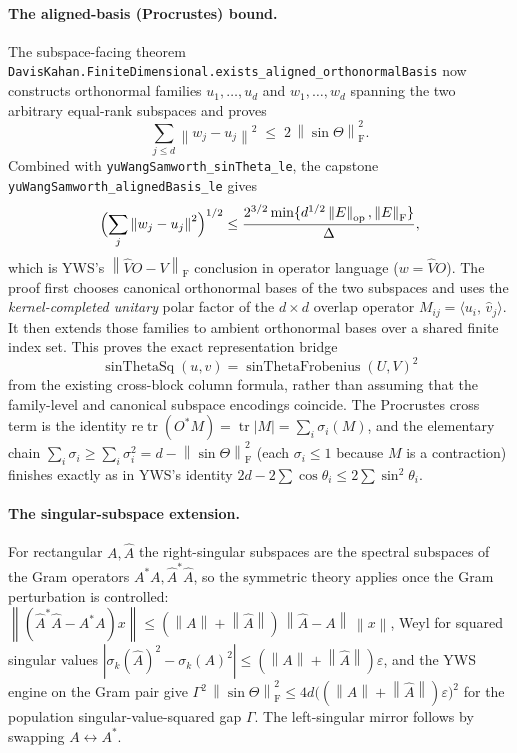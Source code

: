 \documentclass[11pt]{article}
\newcommand{\norm}[1]{\left\lVert #1\right\rVert}
\newcommand{\eps}{\varepsilon}
\newcommand{\F}{\mathrm{F}}
\newcommand{\op}{\mathrm{op}}
\newcommand{\inner}[2]{\langle #1,\,#2\rangle}
\newcommand{\sinT}{\sin\Theta}
\DeclareMathOperator{\tr}{tr}
\theoremstyle{remark}
\begin{document}
\paragraph{The aligned-basis (Procrustes) bound.}
The subspace-facing theorem
\texttt{DavisKahan.FiniteDimensional.exists\_aligned\_orthonormalBasis} now constructs
orthonormal families $u_1,\dots,u_d$ and $w_1,\dots,w_d$ spanning the two
arbitrary equal-rank subspaces and proves
\[
  \sum_{j\le d}\norm{w_j-u_j}^2\;\le\;2\,\norm{\sinT}_{\F}^2.
\]
Combined with \texttt{yuWangSamworth\_sinTheta\_le}, the capstone
\texttt{yuWangSamworth\_alignedBasis\_le} gives
\[
  \Bigl(\sum_j\norm{w_j-u_j}^2\Bigr)^{1/2}
  \le\frac{2^{3/2}\min\{d^{1/2}\norm{E}_{\op},\norm{E}_{\F}\}}{\Delta},
\]
which is YWS's $\norm{\widehat VO-V}_{\F}$ conclusion in operator language
($w=\widehat VO$).  The proof first chooses canonical orthonormal bases of the
two subspaces and uses the \emph{kernel-completed unitary} polar factor of the
$d\times d$ overlap operator $M_{ij}=\inner{u_i}{\widehat v_j}$.  It then
extends those families to ambient orthonormal bases over a shared finite index
set.  This proves the exact representation bridge
\[
  \operatorname{sinThetaSq}(u,v)
  = \operatorname{sinThetaFrobenius}(U,V)^2
\]
from the existing cross-block column formula, rather than assuming that the
family-level and canonical subspace encodings coincide.  The Procrustes cross
term is the identity
$\mathrm{re}\tr(O^{*}M)=\tr\lvert M\rvert=\sum_i\sigma_i(M)$, and the
elementary chain $\sum_i\sigma_i\ge\sum_i\sigma_i^2=d-\norm{\sinT}_{\F}^2$
(each $\sigma_i\le 1$ because $M$ is a contraction) finishes exactly as in
YWS's identity $2d-2\sum\cos\theta_i\le2\sum\sin^2\theta_i$.

\paragraph{The singular-subspace extension.}
For rectangular $A,\widehat A$ the right-singular subspaces are the spectral
subspaces of the Gram operators $A^{*}A,\widehat A^{*}\widehat A$, so the
symmetric theory applies once the Gram perturbation is controlled:
$\norm{(\widehat A^{*}\widehat A-A^{*}A)x}\le(\norm{A}+\norm{\widehat
A})\,\norm{\widehat A-A}\,\norm{x}$, Weyl for squared singular values
$|\sigma_k(\widehat A)^2-\sigma_k(A)^2|\le(\norm{A}+\norm{\widehat A})\eps$,
and the YWS engine on the Gram pair give
$\Gamma^2\,\norm{\sinT}_{\F}^2\le 4d\bigl((\norm{A}+\norm{\widehat
A})\eps\bigr)^2$ for the population singular-value-squared gap $\Gamma$.  The
left-singular mirror follows by swapping $A\leftrightarrow A^{*}$.
\end{document}
